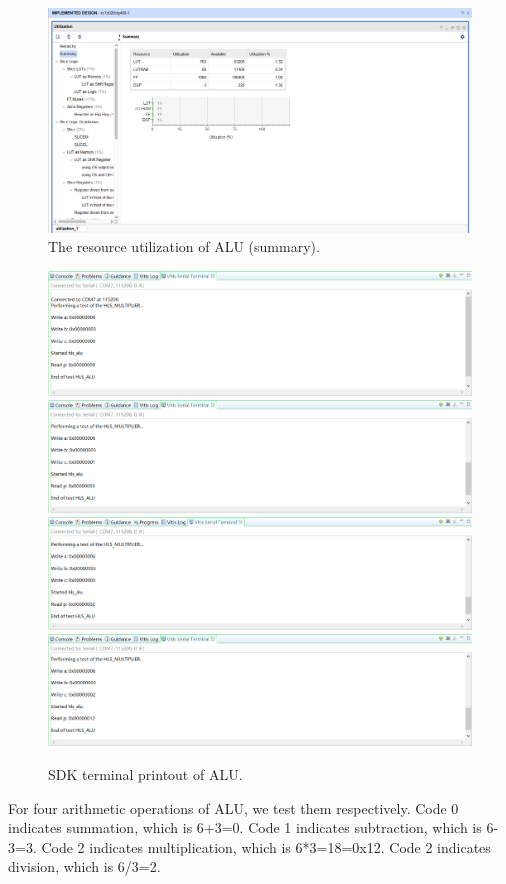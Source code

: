 \documentclass[a4paper]{article}
\begin{document}
\begin{figure}[H]
    \centering
    \includegraphics[width=1\textwidth]{5.png}
    \caption{The resource utilization of ALU (summary).}
\end{figure}
\begin{figure}[H]
    \centering
    \includegraphics[width=1\textwidth]{6.png}
    \includegraphics[width=1\textwidth]{7.png}
    \includegraphics[width=1\textwidth]{8.png}
    \includegraphics[width=1\textwidth]{9.png}
    \caption{SDK terminal printout of ALU.}
\end{figure}
For four arithmetic operations of ALU, we test them respectively. Code 0 indicates summation, which is 6+3=0. Code 1 indicates subtraction, which is 6-3=3. Code 2 indicates multiplication, which is 6*3=18=0x12. Code 2 indicates division, which is 6/3=2. 
\end{document}
